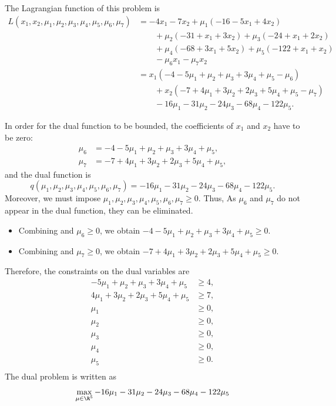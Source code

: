 The Lagrangian function of this problem is 
\begin{align*}
L(x_1, x_2, \mu_1, \mu_2, \mu_3, \mu_4, \mu_5, \mu_6, \mu_7)& =-4x_1-7x_2 + \mu_1(-16 -5x_1 +4x_2)\\ & \qquad +\mu_2(-31 +x_1 +3x_2 ) + \mu_3(-24 +x_1 +2x_2) \\& \qquad  +\mu_4(-68 +3x_1 +5x_2 ) + \mu_5(-122 +x_1 +x_2 )\\ & \qquad   - \mu_6x_1 -\mu_7x_2\\
&= x_1(-4 -5\mu_1+\mu_2+\mu_3+3\mu_4+\mu_5-\mu_6)\\ & \qquad + x_2(-7 +4\mu_1+3\mu_2+2\mu_3+5\mu_4+\mu_5-\mu_7)\\ & \qquad -16\mu_1 -31\mu_2 -24\mu_3 -68\mu_4-122\mu_5.
\end{align*}

In order for the dual function to be bounded, the coefficients of
$x_1$ and $x_2$ have to be zero:
\begin{align}
  \mu_6 &= -4 -5\mu_1+\mu_2+\mu_3+3\mu_4+\mu_5,  \label{eq:mu6}\\
  \mu_7 &= -7 +4\mu_1+3\mu_2+2\mu_3+5\mu_4+\mu_5, \label{eq:mu7}
\end{align}
and the dual function is
\[
q(\mu_1, \mu_2, \mu_3, \mu_4, \mu_5, \mu_6, \mu_7) = -16\mu_1 -31\mu_2 -24\mu_3 -68\mu_4-122\mu_5.
\]
Moreover,  we must impose $ \mu_1, \mu_2, \mu_3,
\mu_4, \mu_5, \mu_6, \mu_7 \geq 0$. Thus,
As $\mu_6$ and $\mu_7$ do not appear in the dual function, they can be
eliminated.
\begin{itemize}
\item Combining  and $\mu_6 \geq 0$, we obtain $-4
  -5\mu_1+\mu_2+\mu_3+3\mu_4+\mu_5 \geq 0$.
\item Combining  and $\mu_7 \geq 0$, we obtain $-7
  +4\mu_1+3\mu_2+2\mu_3+5\mu_4+\mu_5 \geq 0$.
\end{itemize}
Therefore, the constraints on the dual variables are
\begin{align*}
-5\mu_1+\mu_2+\mu_3+3\mu_4+\mu_5 &\geq 4, \\
4\mu_1+3\mu_2+2\mu_3+5\mu_4+\mu_5 &\geq 7, \\
\mu_1 &\geq 0, \\
\mu_2 &\geq 0, \\
\mu_3 &\geq 0, \\
\mu_4 &\geq 0, \\
\mu_5 &\geq 0. \\
\end{align*}
The dual problem is written as
\[
\max_{\mu \in \R^5} -16\mu_1 -31\mu_2 -24\mu_3 -68\mu_4-122\mu_5
\]
